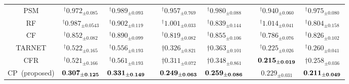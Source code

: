 \begin{table}[tbp]
{\begin{tabular} {ccccccccc }
\multicolumn{1}{c}{PSM}    &        $^\dagger0.972_{\pm{0.085}}$       &       $^\dagger0.989_{\pm{0.093}}$         & \multicolumn{1}{l}{} &   $^\dagger0.957_{\pm{0.769}}$     &    $^\dagger0.980_{\pm{0.088}}$    &  &   $^\dagger0.940_{\pm{0.060}}$ & $^\dagger0.975_{\pm{0.080}}$      \\[3pt]
\cmidrule{1-9}

\multicolumn{1}{c}{RF}    &        $^\dagger0.987_{\pm{0.0543}}$       &       $^\dagger0.902_{\pm{0.119}}$         & \multicolumn{1}{l}{} &   $^\dagger1.001_{\pm{0.033}}$      &    $^\dagger0.839_{\pm{0.144}}$     &  &   $ ^\dagger1.014_{\pm{0.041}}$ & $^\dagger0.804_{\pm{0.158}}$\\[3pt]
\multicolumn{1}{c}{CF}    &        $^\dagger0.852_{\pm{0.082}}$       &       $^\dagger0.890_{\pm{0.099}}$         & \multicolumn{1}{l}{} &   $^\dagger0.819_{\pm{0.082}}$      &    $^\dagger0.855_{\pm{0.106}}$   &  &   $^\dagger0.786_{\pm{0.076}}$  &  $^\dagger0.826_{\pm{0.102}}$\\[3pt]
\cmidrule{1-9}


\multicolumn{1}{c}{TARNET}    &        $^\dagger0.522_{\pm{0.165}}$       &       $^\dagger0.556_{\pm{0.193}}$         & \multicolumn{1}{l}{} &   $\dagger0.326_{\pm{0.821}}$  &    $\dagger0.363_{\pm{0.101}}$   &     &   $^\dagger0.225_{\pm{0.026}}$& $^\dagger0.260_{\pm{0.041}}$      \\[3pt]
\multicolumn{1}{c}{CFR}    &        $^\dagger0.521_{\pm{0.166}}$       &       $^\dagger0.561_{\pm{0.193}}$         & \multicolumn{1}{l}{} &  $\dagger0.311_{\pm{0.072}}$ &    $\dagger0.348_{\pm{0.861}}$      &  &   $\bf{0.215_{\pm{0.019}}}$ & $\dagger0.258_{\pm{0.036}}	$   	 \\[3pt]
\cmidrule{1-9}

CP~(proposed) &       $\bf 0.307_{\pm{0.125}}$ & $\bf 0.331_{\pm{0.149}}$        & \multicolumn{1}{l}{} &     $\bf 0.249_{\pm{0.063}}$          & $\bf 0.259_{\pm{0.086}}$       &  &   $0.229_{\pm{0.031}} $& ${\bf 0.211_{\pm{0.049}}}$      \\[3pt]

\bottomrule[2pt]
    \end{tabular}
    }
\end{table}





